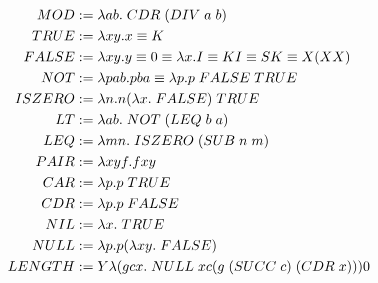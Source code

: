 \begin{figure}[htb]
\[\begin{aligned}
        MOD &:= \lambda ab. \hspace{0.1cm} CDR \hspace{0.1cm} (DIV \hspace{0.1cm} a \hspace{0.1cm} b)\\
        TRUE &:= \lambda xy. x \equiv K\\
        FALSE &:= \lambda xy. y \equiv 0 \equiv \lambda x. I \equiv K I \equiv S K \equiv X (X X)\\
        NOT &:= \lambda pab. p  b a \equiv \lambda p. p \hspace{0.1cm} FALSE \hspace{0.1cm} TRUE\\
        ISZERO &:= \lambda n. n (\lambda x. \hspace{0.1cm} FALSE) \hspace{0.1cm} TRUE\\
        LT &:= \lambda ab. \hspace{0.1cm} NOT \hspace{0.1cm} (LEQ \hspace{0.1cm} b \hspace{0.1cm} a)\\
        LEQ &:= \lambda mn. \hspace{0.1cm} ISZERO \hspace{0.1cm} (SUB \hspace{0.1cm} n \hspace{0.1cm} m)\\
        PAIR &:= \lambda xyf. f x y\\
        CAR &:= \lambda p. p \hspace{0.1cm} TRUE\\
        CDR &:= \lambda p. p \hspace{0.1cm} FALSE\\
        NIL &:= \lambda x. \hspace{0.1cm} TRUE\\
        NULL &:= \lambda p. p (\lambda xy. \hspace{0.1cm} FALSE)\\
        LENGTH &:= Y \lambda (gcx. \hspace{0.1cm} NULL \hspace{0.1cm} x c (g \hspace{0.1cm} (SUCC \hspace{0.1cm} c) \hspace{0.1cm} (CDR \hspace{0.1cm} x))) 0\\
    \end{aligned}
\]


\end{figure}
